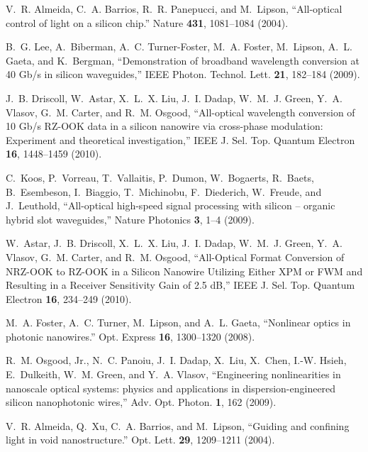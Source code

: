 \documentclass[10pt,letterpaper]{article}
\begin{document}
\begin{thebibliography}{10}
\newcommand{\enquote}[1]{``#1''}

V.~R. Almeida, C.~A. Barrios, R.~R. Panepucci, and M.~Lipson,
  \enquote{{All-optical control of light on a silicon chip.}} Nature
  \textbf{431}, 1081--1084 (2004).

B.~G. Lee, A.~Biberman, A.~C. Turner-Foster, M.~A. Foster, M.~Lipson, A.~L.
  Gaeta, and K.~Bergman, \enquote{{Demonstration of broadband wavelength
  conversion at 40 Gb/s in silicon waveguides},} IEEE Photon. Technol. Lett. \textbf{21}, 182--184 (2009).

J.~B. Driscoll, W.~Astar, X.~L.~X. Liu, J.~I. Dadap, W.~M.~J. Green, Y.~A.
  Vlasov, G.~M. Carter, and R.~M. Osgood, \enquote{{All-optical wavelength
  conversion of 10 Gb/s RZ-OOK data in a silicon nanowire via cross-phase
  modulation: Experiment and theoretical investigation},} IEEE J. Sel. Top. Quantum Electron \textbf{16}, 1448--1459 (2010).

C.~Koos, P.~Vorreau, T.~Vallaitis, P.~Dumon, W.~Bogaerts, R.~Baets,
  B.~Esembeson, I.~Biaggio, T.~Michinobu, F.~Diederich, W.~Freude, and
  J.~Leuthold, \enquote{{All-optical high-speed signal processing with silicon
  – organic hybrid slot waveguides},} Nature Photonics \textbf{3}, 1--4
  (2009).

W.~Astar, J.~B. Driscoll, X.~L.~X. Liu, J.~I. Dadap, W.~M.~J. Green, Y.~A.
  Vlasov, G.~M. Carter, and R.~M. Osgood, \enquote{{All-Optical Format
  Conversion of NRZ-OOK to RZ-OOK in a Silicon Nanowire Utilizing Either XPM or
  FWM and Resulting in a Receiver Sensitivity Gain of 2.5 dB},} IEEE J. Sel. Top. Quantum Electron \textbf{16}, 234--249 (2010).

M.~A. Foster, A.~C. Turner, M.~Lipson, and A.~L. Gaeta, \enquote{{Nonlinear
  optics in photonic nanowires.}} Opt. Express \textbf{16}, 1300--1320
  (2008).

R.~M. Osgood, Jr., N.~C. Panoiu, J.~I. Dadap, X.~Liu, X.~Chen, I.-W. Hsieh,
  E.~Dulkeith, W.~M. Green, and Y.~A. Vlasov, \enquote{{Engineering
  nonlinearities in nanoscale optical systems: physics and applications in
  dispersion-engineered silicon nanophotonic wires},} Adv. Opt. Photon. \textbf{1}, 162 (2009).

V.~R. Almeida, Q.~Xu, C.~A. Barrios, and M.~Lipson, \enquote{{Guiding and
  confining light in void nanostructure.}} Opt. Lett. \textbf{29}, 1209--1211
  (2004).


\end{thebibliography}
\end{document}
